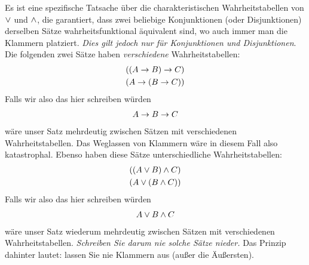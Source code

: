 Es ist eine spezifische Tatsache über die charakteristischen Wahrheitstabellen von $\vee$ und $\wedge$, die garantiert, dass zwei beliebige Konjunktionen (oder Disjunktionen) derselben Sätze wahrheitsfunktional äquivalent sind, wo auch immer man die Klammern platziert. \emph{Dies gilt jedoch nur für Konjunktionen und Disjunktionen}. Die folgenden zwei Sätze haben \emph{verschiedene} Wahrheitstabellen:
	\begin{align*}
		((A \rightarrow B) \rightarrow C)\\
		(A \rightarrow (B \rightarrow C))
	\end{align*}
Falls wir also das hier schreiben würden
	\begin{align*}
		A \rightarrow B \rightarrow C
	\end{align*}
wäre unser Satz mehrdeutig zwischen Sätzen mit verschiedenen Wahrheitstabellen. Das Weglassen von Klammern wäre in diesem Fall also katastrophal. Ebenso haben diese Sätze unterschiedliche Wahrheitstabellen:
	\begin{align*}
		((A \vee B) \wedge C)\\
		(A \vee (B \wedge C))
	\end{align*}
Falls wir also das hier schreiben würden
	\begin{align*}
		A \vee B \wedge C
	\end{align*}
wäre unser Satz wiederum mehrdeutig zwischen Sätzen mit verschiedenen Wahrheitstabellen. \emph{Schreiben Sie darum nie solche Sätze nieder.} Das Prinzip dahinter lautet: lassen Sie nie Klammern aus (au{\ss}er die Äu{\ss}ersten).

